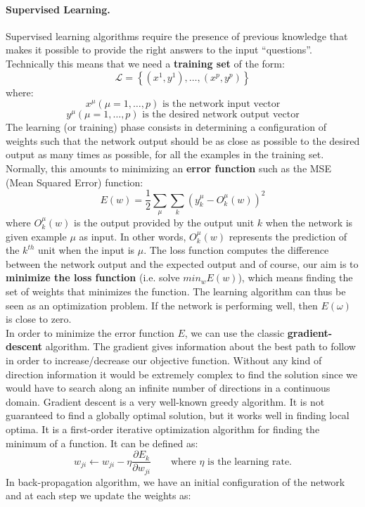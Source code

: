 \paragraph*{Supervised Learning.} Supervised learning algorithms require the presence of previous knowledge that makes it possible to provide the right answers to the input ``questions''. Technically this means that we need a \textbf{training set} of the form:
$$\mathcal{L} =\left\{\left(x^1, y^1 \right), \dots , \left(x^p, y ^p \right) \right\}$$
where:
$$x^\mu (\mu=1,\dots, p) \text{ is the network input vector}$$
$$y^\mu (\mu=1,\dots, p) \text{ is the desired network output vector}$$
The learning (or training) phase consists in determining a configuration of weights such that the network output should be as close as possible to the desired output as many times as possible, for all the examples in the training set. Normally, this amounts to minimizing an \textbf{error function} such as the MSE (Mean Squared Error) function:
$$E(w) = \frac{1}{2} \sum_{\mu} \sum_{k} \left(y_k^\mu - O_k^\mu(w)\right)^2$$
where $O_k^\mu(w)$ is the output provided by the output unit $k$ when the network is given example $\mu$ as input. In other words, $O_k^\mu(w)$ represents the prediction of the $k^{th}$ unit when the input is $\mu$. The loss function computes the difference between the network output and the expected output and of course, our aim is to \textbf{minimize the loss function} (i.e. solve $min_w E(w)$), which means finding the set of weights that minimizes the function. The learning algorithm can thus be seen as an optimization problem. If the network is performing well, then $E(\omega)$ is close to zero.\\
In order to minimize the error function $E$, we can use the classic \textbf{gradient-descent} algorithm. The gradient gives information about the best path to follow in order to increase/decrease our objective function. Without any kind of direction information it would be extremely complex to find the solution since we would have to search along an infinite number of directions in a continuous domain. Gradient descent is a very well-known greedy algorithm. It is not guaranteed to find a globally optimal solution, but it works well in finding local optima. It is a first-order iterative optimization algorithm for finding the minimum of a function. It can be defined as:
$$w_{ji} \leftarrow w_{ji} - \eta \frac{\partial E_k}{\partial w_{ji}} \qquad \text{where } \eta \text{ is the learning rate.}$$
In back-propagation algorithm, we have an initial configuration of the network and at each step we update the weights as:
